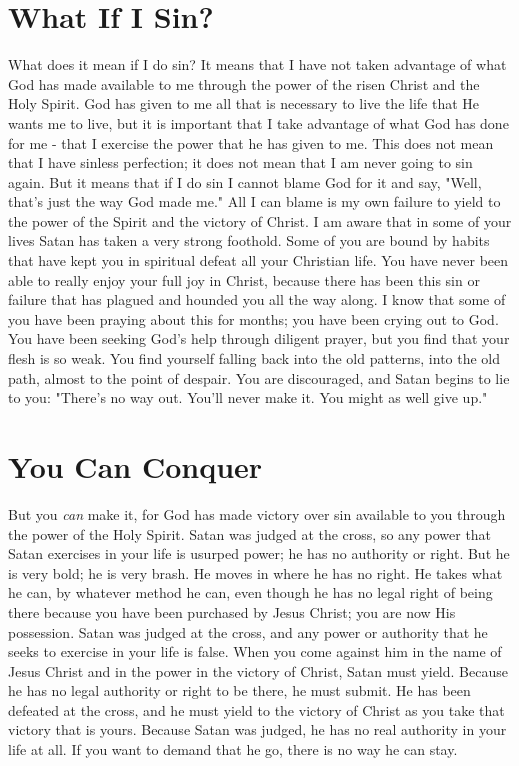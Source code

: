 \section*{What If I Sin?}

What does it mean if I do sin? It means that I have not taken advantage of what God has made available to me through the power of the risen Christ and the Holy Spirit. God has given to me all that is necessary to live the life that He wants me to live, but it is important that I take advantage of what God has done for me - that I exercise the power that he has given to me. This does not mean that I have sinless perfection; it does not mean that I am never going to sin again. But it means that if I do sin I cannot blame God for it and say, "Well, that's just the way God made me." All I can blame is my own failure to yield to the power of the Spirit and the victory of Christ. I am aware that in some of your lives Satan has taken a very strong foothold. Some of you are bound by habits that have kept you in spiritual defeat all your Christian life. You have never been able to really enjoy your full joy in Christ, because there has been this sin or failure that has plagued and hounded you all the way along. I know that some of you have been praying about this for months; you have been crying out to God. You have been seeking God's help through diligent prayer, but you find that your flesh is so weak. You find yourself falling back into the old patterns, into the old path, almost to the point of despair. You are discouraged, and Satan begins to lie to you: "There's no way out. You'll never make it. You might as well give up." 

\section*{You Can Conquer}

But you \emph{can} make it, for God has made victory over sin available to you through the power of the Holy Spirit. Satan was judged at the cross, so any power that Satan exercises in your life is usurped power; he has no authority or right. But he is very bold; he is very brash. He moves in where he has no right. He takes what he can, by whatever method he can, even though he has no legal right of being there because you have been purchased by Jesus Christ; you are now His possession. Satan was judged at the cross, and any power or authority that he seeks to exercise in your life is false. When you come against him in the name of Jesus Christ and in the power in the victory of Christ, Satan must yield. Because he has no legal authority or right to be there, he must submit. He has been defeated at the cross, and he must yield to the victory of Christ as you take that victory that is yours. Because Satan was judged, he has no real authority in your life at all. If you want to demand that he go, there is no way he can stay. 

